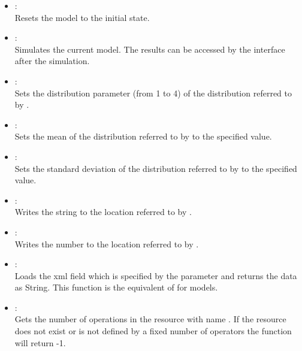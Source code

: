 \begin{itemize}

\item
{}:\\
Resets the model to the initial state.

\item
{}:\\
Simulates the current model.
The results can be accessed by the  interface after the simulation.

\item
{}:\\
Sets the distribution parameter  (from 1 to 4) of the distribution referred
to by .

\item
{}:\\
Sets the mean of the distribution referred to by  to the specified value.

\item
{}:\\
Sets the standard deviation of the distribution referred to by  to the specified value.  

\item
{}:\\
Writes the string  to the location referred to by .

\item
{}:\\
Writes the number  to the location referred to by .  

\item
{}:\\
Loads the xml field which is specified by the parameter and returns the data 
as String. This function is the equivalent of 
for models.

\item
{}:\\
Gets the number of operations in the resource with name .
If the resource does not exist or is not defined by a fixed number of operators
the function will return -1.


\end{itemize}
